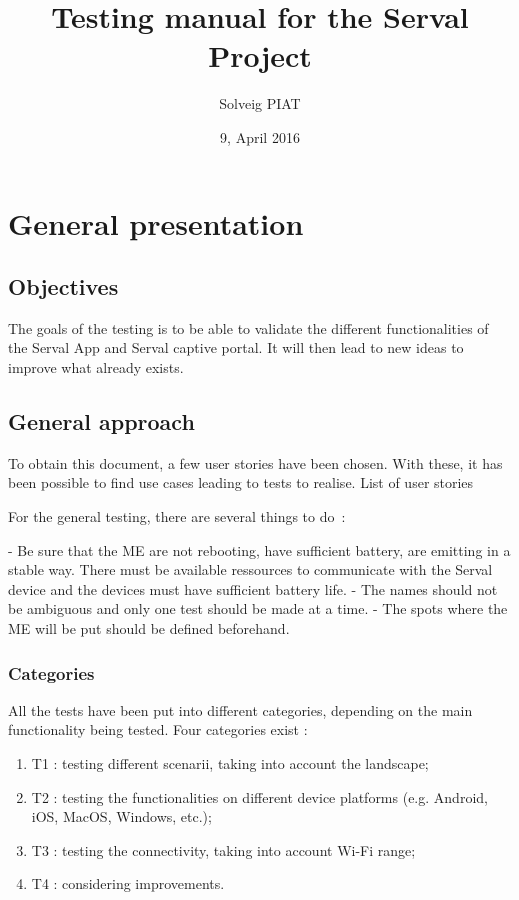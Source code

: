 \documentclass[oneside]{book}
\title{Testing manual for the Serval Project}
\author{Solveig PIAT}
\date{9, April 2016}
\begin{document}
\maketitle
\setcounter{tocdepth}{1}
\tableofcontents
\newpage

\mainmatter
\part{General presentation}

\chapter{Objectives}
The goals of the testing is to be able to validate the different functionalities of the Serval App and Serval captive portal. It will then lead to new ideas to improve what already exists.
\chapter{General approach}
To obtain this document, a few user stories have been chosen. With these, it has been possible to find use cases leading to tests to realise. 
List of user stories 

For the general testing, 
there are several things to do :

- Be sure that the ME are not rebooting, have sufficient battery, are emitting in a stable way. There must be available ressources to communicate with the Serval device and the devices must have sufficient battery life. 
- The names should not be ambiguous and only one test should be made at a time.
- The spots where the ME will be put should be defined beforehand. 
\section{Categories}
All the tests have been put into different categories, depending on the main functionality being tested. 
Four categories exist :
\begin{enumerate}
\item T1 : testing different scenarii, taking into account the landscape; 
\item T2 : testing the functionalities on different device platforms (e.g. Android, iOS, MacOS, Windows, etc.);
\item T3 : testing the connectivity, taking into account Wi-Fi range;
\item T4 : considering improvements.
\end{enumerate}
\end{document}
